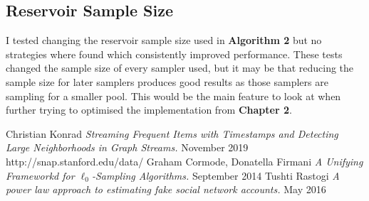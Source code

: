 \documentclass[11pt,twoside,a4paper]{report}
\begin{document}
\subsection*{Reservoir Sample Size}
I tested changing the reservoir sample size used in \textbf{Algorithm 2} but no strategies where found which consistently improved performance. These tests changed the sample size of every sampler used, but it may be that reducing the sample size for later samplers produces good results as those samplers are sampling for a smaller pool. This would be the main feature to look at when further trying to optimised the implementation from \textbf{Chapter 2}.

\begin{thebibliography}{4}
	 Christian Konrad \textit{Streaming Frequent Items with Timestamps and Detecting Large Neighborhoods in Graph Streams.} November 2019
	http://snap.stanford.edu/data/
	 Graham Cormode, Donatella Firmani \textit{A Unifying Frameworkd for $\ell_0$-Sampling Algorithms.} September 2014
   Tushti Rastogi \textit{A power law approach to estimating fake social network accounts.} May 2016
\end{thebibliography}
\end{document}
